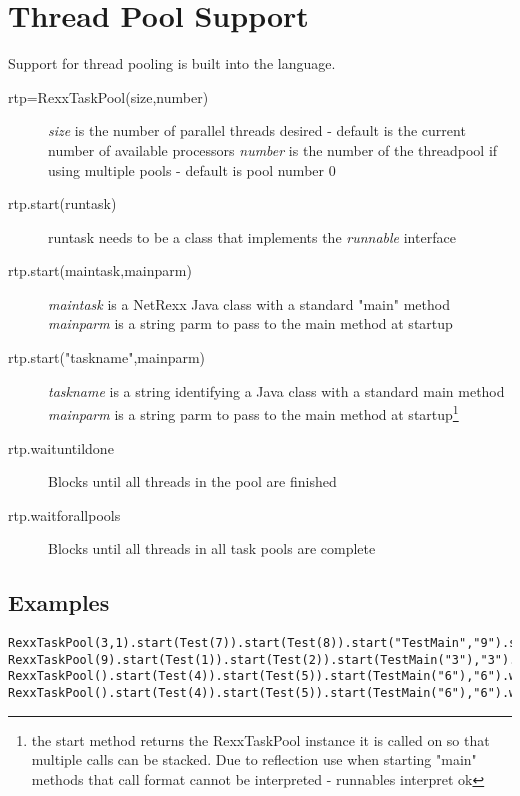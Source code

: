 \chapter{Thread Pool Support}\label{refthreads}

 Support for thread pooling is built into the \nr{} language. 


\begin{description}
\item[rtp=RexxTaskPool(size,number)]
\emph{size} is the number of parallel threads desired - default is the current number of available processors
\emph{number} is the number of the threadpool if using multiple pools - default is pool number 0

\item[rtp.start(runtask)]
runtask needs to be a class that implements the \emph{runnable} interface

\item[rtp.start(maintask,mainparm)]
\emph{maintask} is a NetRexx Java class with a standard "main" method
\emph{mainparm} is a string parm to pass to the main method at startup

\item[rtp.start("taskname",mainparm)]
\emph{taskname} is a string identifying a Java class with a standard main method
\emph{mainparm} is a string parm to pass to the main method at
startup\footnote{the start method returns the RexxTaskPool instance it
  is called on so that multiple calls can be stacked. Due to reflection use when starting "main" methods that call format cannot be interpreted - runnables interpret ok}

\item[rtp.waituntildone]
Blocks until all threads in the pool are finished

\item[rtp.waitforallpools]
Blocks until all threads in all task pools are complete
\end{description}

\section{Examples}
\begin{lstlisting}[label=threadpool,caption=ThreadPool example]
RexxTaskPool(3,1).start(Test(7)).start(Test(8)).start("TestMain","9").start("enviroscan")
RexxTaskPool(9).start(Test(1)).start(Test(2)).start(TestMain("3"),"3").start(enviroscan.class)
RexxTaskPool().start(Test(4)).start(Test(5)).start(TestMain("6"),"6").waituntildone
RexxTaskPool().start(Test(4)).start(Test(5)).start(TestMain("6"),"6").waitforallpools
\end{lstlisting}